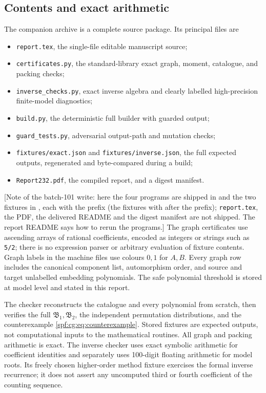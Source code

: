 \documentclass[11pt]{article}
\numberwithin{equation}{section}
\theoremstyle{definition}
\theoremstyle{remark}
\theoremstyle{definition}
\begin{document}
\subsection{Contents and exact arithmetic}
The companion archive is a complete source package. Its principal files are
\begin{itemize}
 \item \texttt{report.tex}, the single-file editable manuscript source;
 \item \texttt{certificates.py}, the standard-library exact graph, moment,
       catalogue, and packing checks;
 \item \texttt{inverse\_checks.py}, exact inverse algebra and clearly labelled
       high-precision finite-model diagnostics;
 \item \texttt{build.py}, the deterministic full builder with guarded output;
 \item \texttt{guard\_tests.py}, adversarial output-path and mutation checks;
 \item \texttt{fixtures/exact.json} and \texttt{fixtures/inverse.json}, the
       full expected outputs, regenerated and byte-compared during a build;
 \item \texttt{Report232.pdf}, the compiled report, and a digest manifest.
\end{itemize}
[Note of the batch-101 write: here the four programs are shipped in
 and the two fixtures in , each with the prefix
 (the fixtures with  after the
prefix); \texttt{report.tex}, the
PDF, the delivered README and the digest manifest are not shipped. The
report README says how to rerun the programs.] The graph certificates use ascending arrays of rational
coefficients, encoded as integers or strings such as \texttt{5/2}; there is
no expression parser or arbitrary evaluation of fixture contents. Graph
labels in the machine files use colours $0,1$ for $A,B$. Every graph row
includes the canonical component list, automorphism order, and source and
target unlabelled embedding polynomials. The safe polynomial threshold is
stored at model level and stated in this report.

The checker reconstructs the catalogue and every polynomial from scratch,
then verifies the full $\mathfrak B_1,\mathfrak B_2$, the independent
permutation distributions, and the counterexample
\eqref{spf:cg:eq:counterexample}. Stored fixtures are expected outputs, not
computational inputs to the mathematical routines. All graph and packing
arithmetic is exact. The inverse checker uses exact symbolic arithmetic for
coefficient identities and separately uses 100-digit floating arithmetic for
model roots. Its freely chosen higher-order method fixture exercises the
formal inverse recurrence; it does not assert any uncomputed third or fourth
coefficient of the counting sequence.
\end{document}
